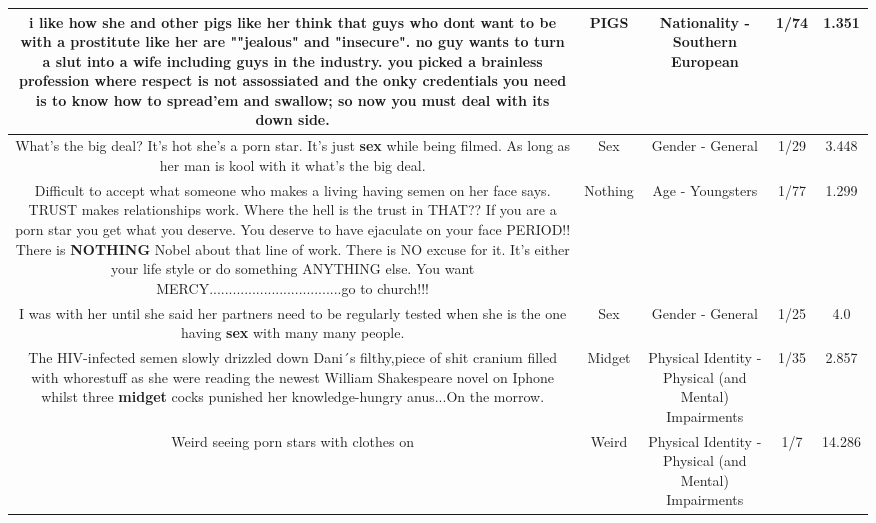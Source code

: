 \documentclass[11pt]{article}
\newlength\mylength
\begin{document}
\begin{center}
\begin{longtable}{|C{.65\mylength}|C{.30\mylength}|C{.12\mylength}|C{.12\mylength}|C{.12\mylength}|}
  \small i like how she and other \textbf{pigs} like her think that guys who dont want to be with a prostitute like her are ""jealous" and "insecure". no guy wants to turn a slut into a wife including guys in the industry. you picked a brainless  profession where respect is not assossiated and the onky credentials you need is to know how to spread'em and swallow; so now you must deal with its down side.\normalsize   & PIGS & Nationality - Southern European & 1/74 & 1.351 \\  \hline
  \small What's the big deal? It's hot she's a porn star. It's just \textbf{sex} while being filmed. As long as her man is kool with it what's the big deal.\normalsize   & Sex & Gender - General & 1/29 & 3.448 \\  \hline
  \small Difficult to accept what someone who makes a living having semen on her face says. TRUST makes relationships work. Where the hell is the trust in THAT?? If you are a porn star you get what you deserve. You deserve to have ejaculate on your face PERIOD!! There is \textbf{NOTHING} Nobel about that line of work. There is NO excuse for it. It's either your life style or do something ANYTHING else. You want MERCY..................................go to church!!!\normalsize   & Nothing & Age - Youngsters & 1/77 & 1.299 \\  \hline
  \small I was with her until she said her partners need to be regularly tested when she is the one having \textbf{sex} with many many people.\normalsize   & Sex & Gender - General & 1/25 & 4.0 \\  \hline
  \small The HIV-infected semen slowly drizzled down Dani´s filthy,piece of shit cranium filled with whorestuff as she were reading the newest William Shakespeare novel on Iphone whilst three \textbf{midget} cocks punished her knowledge-hungry anus...On the morrow.\normalsize   & Midget & Physical Identity - Physical (and Mental) Impairments & 1/35 & 2.857 \\  \hline
  \small Weird seeing porn stars with clothes on\normalsize   & Weird & Physical Identity - Physical (and Mental) Impairments & 1/7 & 14.286 \\  \hline

\end{longtable}
\end{center}
\end{document}
